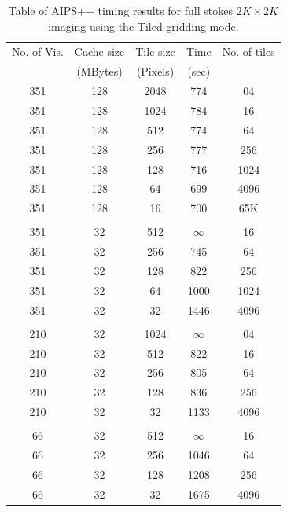 \begin{table}
\begin{center}
\caption{\small Table of AIPS++ timing results for full stokes $2K\times 2K$
imaging using the Tiled gridding mode.}
\label{STOKES_TAB}
\vskip 0.5cm
\begin{tabular}{|c|c|c|c|c|}
\hline
No. of Vis. & Cache size & Tile size & Time     & No. of tiles \\
            & (MBytes)   & (Pixels)  & (sec)    &              \\
\hline
351         &  128       &  2048     & 774      &    04        \\
351         &  128       &  1024     & 784      &    16        \\
351         &  128       &  512      & 774      &    64        \\
351         &  128       &  256      & 777      &   256        \\
351         &  128       &  128      & 716      &  1024        \\
351         &  128       &  64       & 699      &  4096        \\
351         &  128       &  16       & 700      &  65K         \\
            &            &           &          &              \\
351         &  32        &  512      & $\infty$ &   16         \\
351         &  32        &  256      & 745      &   64         \\
351         &  32        &  128      & 822      &  256         \\
351         &  32        &  64       & 1000     & 1024         \\
351         &  32        &  32       & 1446     & 4096         \\
            &            &           &          &              \\
210         &  32        &  1024     & $\infty$ &   04         \\
210         &  32        &  512      & 822      &   16         \\
210         &  32        &  256      & 805      &   64         \\
210         &  32        &  128      & 836      &  256         \\
210         &  32        &   32      & 1133     & 4096         \\
            &            &           &          &              \\
66          &  32        &  512      & $\infty$ &   16         \\
66          &  32        &  256      & 1046     &   64         \\
66          &  32        &  128      & 1208     &  256         \\
66          &  32        &   32      & 1675     & 4096         \\
\hline
\end{tabular}
\end{center}
\end{table}



